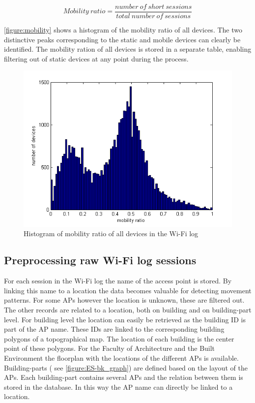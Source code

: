 \[
    Mobility\ ratio = \frac{number\ of\ short\ sessions}{total\ number\ of\ sessions}
\] 

\autoref{figure:mobility} shows a histogram of the mobility ratio of all devices. The two distinctive peaks corresponding to the static and mobile devices can clearly be identified. The mobility ration of all devices is stored in a separate table, enabling filtering out of static devices at any point during the process.

\begin{figure}[H]
\centering
\includegraphics[scale=0.4]{mobility.png}
\captionsetup{justification=centering}
\caption{Histogram of mobility ratio of all devices in the Wi-Fi log}
\label{figure:ES-mobility}
\end{figure}

\subsection{Preprocessing raw Wi-Fi log sessions}\label{ES-preprocessing}
For each session in the Wi-Fi log the name of the access point is stored. By linking this name to a location the data becomes valuable for detecting movement patterns. For some APs however the location is unknown, these are filtered out. The other records are related to a location, both on building and on building-part level. For building level the location can easily be retrieved as the building ID is part of the AP name. These IDs are linked to the corresponding building polygons of a topographical map. The location of each building is the center point of these polygons. For the Faculty of Architecture and the Built Environment the floorplan with the locations of the different APs is available. Building-parts ( see \autoref{figure:ES-bk_graph}) are defined based on the layout of the APs. Each building-part contains several APs and the relation between them is stored in the database. In this way the AP name can directly be linked to a location.  


